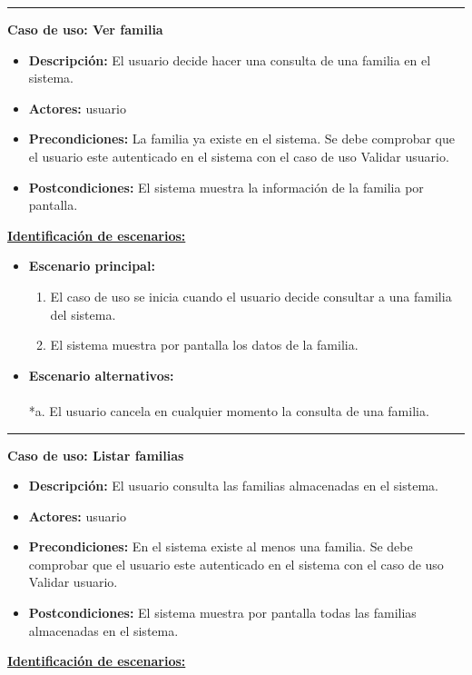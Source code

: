 \smallskip
\hrule height 1pt
\smallskip
\textbf{Caso de uso: Ver familia}
\begin{itemize}\renewcommand{\labelitemi}{$\cdot$}
 \item \textbf{Descripción:} El usuario decide hacer una consulta de una familia en el sistema.
  \item \textbf{Actores:} usuario
  \item \textbf{Precondiciones:} La familia ya existe en el sistema. Se debe comprobar que el usuario este autenticado en el sistema con el caso de uso Validar usuario.
  \item \textbf{Postcondiciones:} El sistema muestra la información de la familia por pantalla.
\end{itemize}
\underline{\textbf{Identificación de escenarios:}}
\begin{itemize}\renewcommand{\labelitemi}{$\circ$}
 \item \textbf{Escenario principal:}
         \begin{enumerate}
          \item El caso de uso se inicia cuando el usuario decide consultar a una familia del sistema.
	  \item El sistema muestra por pantalla los datos de la familia.
         \end{enumerate}
  \item \textbf{Escenario alternativos:}\\\\
          *a. El usuario cancela en cualquier momento la consulta de una familia.
\end{itemize}
\smallskip
\hrule height 1pt
\smallskip
\textbf{Caso de uso: Listar familias}
\begin{itemize}\renewcommand{\labelitemi}{$\cdot$}
 \item \textbf{Descripción:} El usuario consulta las familias almacenadas en el sistema.
  \item \textbf{Actores:} usuario
  \item \textbf{Precondiciones:} En el sistema existe al menos una familia. Se debe comprobar que el usuario este autenticado en el sistema con el caso de uso Validar usuario.
  \item \textbf{Postcondiciones:} El sistema muestra por pantalla todas las familias almacenadas en el sistema.
\end{itemize}
\underline{\textbf{Identificación de escenarios:}}
